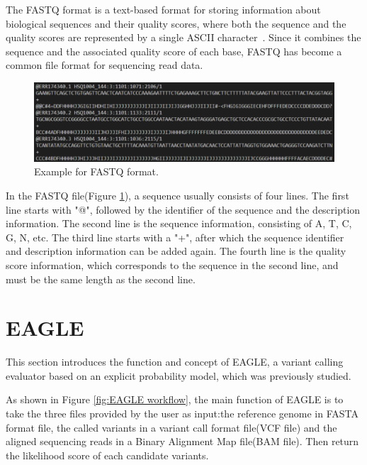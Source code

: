 \documentclass[PhD]{PHlab-thesis}
\begin{document}
The FASTQ format is a text-based format for storing information about biological sequences and their quality scores, where both the sequence and the quality scores are represented by a single ASCII character~\cite{Cock2010FASTQ}. Since it combines the sequence and the associated quality score of each base, FASTQ has become a common file format for sequencing read data.

\begin{figure}[h!]
	\centering
	\includegraphics[scale=0.3]{figures/Example_for_FASTQ_format.png}
	\caption{Example for FASTQ format.}
	\label{fig:FASTQ format} %
\end{figure}

In the FASTQ file(Figure \ref{fig:FASTQ format}), a sequence usually consists of four lines. The first line starts with "@", followed by the identifier of the sequence and the description information. The second line is the sequence information, consisting of A, T, C, G, N, etc. The third line starts with a "+", after which the sequence identifier and description information can be added again. The fourth line is the quality score information, which corresponds to the sequence in the second line, and must be the same length as the second line.

\section{EAGLE}
This section introduces the function and concept of EAGLE, a variant calling evaluator based on an explicit probability model, which was previously studied.

As shown in Figure \ref{fig:EAGLE workflow}, the main function of EAGLE is to take the three files provided by the user as input:the reference genome in FASTA format file, the called variants in a variant call format file(VCF file) and the aligned sequencing reads in a Binary Alignment Map file(BAM file). Then return the likelihood score of each candidate variants.
\end{document}
